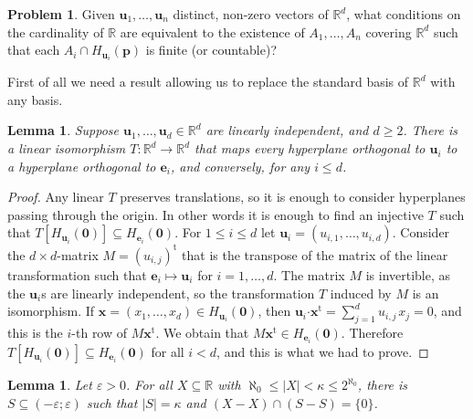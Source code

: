 \documentclass[12pt]{amsart}
\newcommand{\R}{\mathbb{R}}	%
\newcommand{\set}[1]{\mathopen \{ {#1} \mathclose \}} %
\newcommand{\card}[1]{\mathopen | #1 \mathclose |}		%
\theoremstyle{plain}
\newtheorem{lemma}[theorem]{Lemma}
\theoremstyle{definition}
\newtheorem{problem}[theorem]{Problem}
\theoremstyle{remark}
\begin{document}
\begin{problem}\label{prob:hyperplanes}
Given \( \mathbf{u}_1 , \dots , \mathbf{u}_n \) distinct, non-zero vectors of \( \R^d \), what conditions on the cardinality of \( \R \) are equivalent to the existence of \( A_1 , \dots , A_n \) covering \( \R^d \) such that each \( A_i \cap H_{ \mathbf{u}_i } ( \mathbf{p} ) \) is finite (or countable)?
\end{problem}

First of all we need a result allowing us to replace the standard basis of \( \R^d \) with any basis.

\begin{lemma}\label{lem:changecoordinatestogetorthogonalplanes}
Suppose \( \mathbf{u}_1 , \dots , \mathbf{u}_d \in \R^d \) are linearly independent, and \( d \geq 2 \).
There is a linear isomorphism \( T \colon \R^d \to \R^d \) that maps every hyperplane orthogonal to \( \mathbf{u}_i \) to a hyperplane orthogonal to \( \mathbf{e}_i \), and conversely, for any \( i \leq d \).
\end{lemma}

\begin{proof}
Any linear \( T \) preserves translations, so it is enough to consider hyperplanes passing through the origin.
In other words it is enough to find an injective \( T \) such that \( T [ H_{\mathbf{u}_i } ( \mathbf{0} ) ] \subseteq H_{\mathbf{e}_i } ( \mathbf{0} ) \).
For \( 1 \leq i \leq d \) let \( \mathbf{u}_i = ( u_{i , 1} , \dots , u_{i , d} ) \).
Consider the \( d \times d \)-matrix \( M = ( u_{ i , j } )^{\mathrm{t}}\) that is the transpose of the matrix of the linear transformation such that \( \mathbf{e}_i \mapsto \mathbf{u}_i \) for \( i = 1 , \dots , d \).
The matrix \( M \) is invertible, as the \( \mathbf{u}_i \)s are linearly independent, so the transformation \( T \) induced by \( M \) is an isomorphism.
If \( \mathbf{x} = ( x_1 , \dots , x_d ) \in H_{\mathbf{u}_i} ( \mathbf{0} ) \), then \( \mathbf{u}_i \boldsymbol{\cdot} \mathbf{x}^{\mathrm{t}}= \sum _{ j =1 }^d u_{i , j \, } x_j = 0 \), and this is the \( i \)-th row of \( M \mathbf{x}^{\mathrm{t}} \).
We obtain that \( M \mathbf{x}^{\mathrm{t}} \in H_{\mathbf{e}_i} ( \mathbf{0}) \).
Therefore \( T [ H_{\mathbf{u}_i} ( \mathbf{0} ) ] \subseteq H_{\mathbf{e}_i} ( \mathbf{0} ) \) for all \( i < d \), and this is what we had to prove.
\end{proof}

\begin{lemma}\label{lem:setofdifferenceinabeliangroup}
Let \( \varepsilon > 0 \).
For all \( X \subseteq \R \) with \( \aleph_0 \leq \card{X} < \kappa \leq 2^{\aleph_0} \), there is \( S \subseteq ( - \varepsilon ; \varepsilon ) \) such that \( \card{S} = \kappa \) and \( ( X - X ) \cap ( S - S ) = \set{ 0 } \).
\end{lemma}
\end{document}
